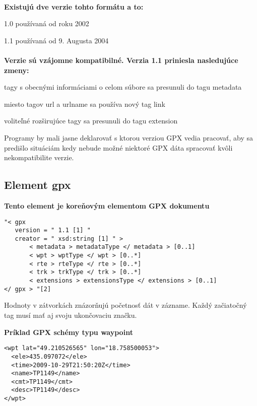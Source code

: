 \paragraph{}
\textbf{Existujú dve verzie tohto formátu a to:}
\begin{list}{•}
\item 1.0 používaná od roku 2002
\item
\item 1.1 používaná od 9. Augusta 2004 
\end{list}
\paragraph{}
\textbf{Verzie sú vzájomne kompatibilné. Verzia 1.1 priniesla nasledujúce zmeny:}
\begin{list}{•}
\item tagy s obecnými informáciami o celom súbore sa presunuli do tagu metadata
\item
\item miesto tagov url a urlname sa používa nový tag link
\item voliteľné rozširujúce tagy sa presunuli do tagu extension
\end{list}

Programy by mali jasne deklarovať s ktorou verziou GPX vedia pracovať, aby sa
predišlo situáciám kedy nebude možné niektoré GPX dáta spracovať kvôli
nekompatibilite verzie.

\subsection{Element gpx}

\begin{center}
\textbf{Tento element je koreňovým elementom GPX dokumentu}
\begin{verbatim}                                                    
"< gpx
   version = " 1.1 [1] "
   creator = " xsd:string [1] " >
       < metadata > metadataType </ metadata > [0..1]
       < wpt > wptType </ wpt > [0..*]
       < rte > rteType </ rte > [0..*]
       < trk > trkType </ trk > [0..*]
       < extensions > extensionsType </ extensions > [0..1]
</ gpx > "[2]
\end{verbatim}
\end{center}
Hodnoty v zátvorkách znázorňujú početnosť dát v zázname. Každý začiatočný tag musí mať aj svoju ukončovaciu značku.\\


\begin{center}
\textbf{Príklad GPX schémy typu waypoint}
\begin{verbatim}
<wpt lat="49.210526565" lon="18.758500053">
  <ele>435.097072</ele>
  <time>2009-10-29T21:50:20Z</time>
  <name>TP1149</name>
  <cmt>TP1149</cmt>
  <desc>TP1149</desc>
</wpt>
\end{verbatim}
\end{center}

